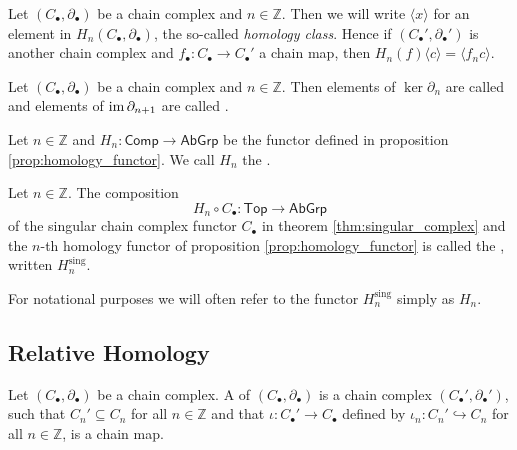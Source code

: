 \begin{remark}
	Let $(C_\bullet,\partial_\bullet)$ be a chain complex and $n \in \mathbb{Z}$. Then we will write $\langle x \rangle$ for an element in $H_n(C_\bullet,\partial_\bullet)$, the so-called \emph{homology class}. Hence if $(C_\bullet',\partial_\bullet')$ is another chain complex and $f_\bullet : C_\bullet \to C_\bullet'$ a chain map, then $H_n(f)\langle c \rangle = \langle f_nc\rangle$. 
\end{remark}

\begin{definition}
	Let $(C_\bullet,\partial_\bullet)$ be a chain complex and $n \in \mathbb{Z}$. Then elements of $\ker \partial_n$ are called  and elements of $\operatorname{im} \partial_{n + 1}$ are called .
\end{definition}

\begin{definition}
	Let $n \in \mathbb{Z}$ and $H_n : \mathsf{Comp} \to \mathsf{AbGrp}$ be the functor defined in proposition \ref{prop:homology_functor}. We call $H_n$ the .
\end{definition}

\begin{definition}
	Let $n \in \mathbb{Z}$. The composition 
	\begin{equation}
		H_n \circ C_\bullet : \mathsf{Top} \to \mathsf{AbGrp}
	\end{equation}
	\noindent of the singular chain complex functor $C_\bullet$ in theorem \ref{thm:singular_complex} and the $n$-th homology functor of proposition \ref{prop:homology_functor} is called the , written $H^{\mathrm{sing}}_n$.
\end{definition}

\begin{remark}
	For notational purposes we will often refer to the functor $H_n^{\mathrm{sing}}$ simply as $H_n$.
\end{remark}

\subsection*{Relative Homology}
\begin{definition}[Subcomplex]
	Let $(C_\bullet,\partial_\bullet)$ be a chain complex. A  of $(C_\bullet,\partial_\bullet)$ is a chain complex $(C_\bullet',\partial_\bullet')$, such that $C_n' \subseteq C_n$ for all $n \in \mathbb{Z}$ and that $\iota : C_\bullet' \to C_\bullet$ defined by $\iota_n : C_n' \hookrightarrow C_n$ for all $n \in \mathbb{Z}$, is a chain map.
\end{definition}

